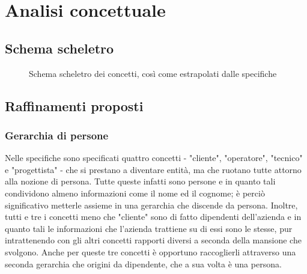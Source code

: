\documentclass[a4paper, 12pt]{report}
\begin{document}
\chapter{Analisi concettuale}

\section{Schema scheletro}

\begin{figure}[H]
	\centering
	\caption{Schema scheletro dei concetti, così come estrapolati dalle specifiche}
\end{figure}

\section{Raffinamenti proposti}

\subsection{Gerarchia di persone}

Nelle specifiche sono specificati quattro concetti - "cliente", "operatore", "tecnico" e "progettista" - che si prestano a diventare entità, ma
che ruotano tutte attorno alla nozione di persona. Tutte queste infatti sono persone e in quanto tali condividono almeno informazioni come il nome
ed il cognome; è perciò significativo metterle assieme in una gerarchia che discende da persona. Inoltre, tutti e tre i concetti meno che "cliente"
sono di fatto dipendenti dell'azienda e in quanto tali le informazioni che l'azienda trattiene su di essi sono le stesse, pur intrattenendo con gli
altri concetti rapporti diversi a seconda della mansione che svolgono. Anche per queste tre concetti è opportuno raccoglierli attraverso una seconda
gerarchia che origini da dipendente, che a sua volta è una persona.
\end{document}
